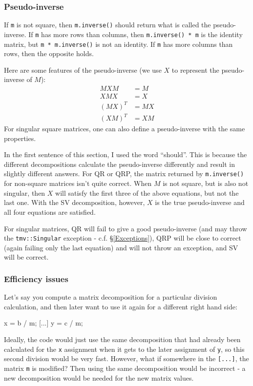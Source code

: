 \documentclass[twoside,letterpaper,11pt]{article}
\renewcommand{\tt}[1]{{\lstinline {#1}}}
\begin{document}
\subsubsection{Pseudo-inverse}
\label{Matrix_Division_Pseudoinverse}

If \tt{m} is not square, then \tt{m.inverse()} should return what is called the pseudo-inverse.
If \tt{m} has more rows than columns, then \tt{m.inverse() * m} is the identity matrix, 
but \tt{m * m.inverse()}
is not an identity.  If \tt{m} has more columns than rows, then the opposite holds.

Here are some features of the pseudo-inverse (we use $X$ to represent the pseudo-inverse
of $M$):
\begin{align*}
M X M &= M \\
X M X &= X \\
(M X)^T &= M X \\
(X M)^T &= X M 
\end{align*}
For singular square matrices, 
one can also define a pseudo-inverse with the same properties.

In the first sentence of this section, I used the word ``should''.  
This is because the different decompositions calculate the pseudo-inverse 
differently and result in slightly
different answers.  For QR or QRP, the matrix returned by \tt{m.inverse()} for
non-square matrices isn't
quite correct.  When $M$ is not square, but is also not singular, then $X$
will satisfy the first three of the above equations,
but not the last one.  With the SV decomposition, however,
$X$ is the true pseudo-inverse and all four equations are satisfied.

For singular matrices, QR will fail to give a good pseudo-inverse (and may throw the
\tt{tmv::Singular} exception - c.f. \S\ref{Exceptions}), QRP will be close to correct
(again failing only the last equation) and will not throw an exception, and SV will be correct.

\subsubsection{Efficiency issues}
\label{Matrix_Division_Efficiency}

Let's say you compute a matrix decomposition for a particular division calculation, and
then later want to use it again for a different right hand side:
\begin{tmvcode}
x = b / m;
[...]
y = c / m;
\end{tmvcode}
Ideally, the code would just use the same decomposition that had already been calculated
for the \tt{x} assignment when it gets to the later assignment of \tt{y}, 
so this second division would be very fast.
However, what if somewhere in the \tt{[...]}, the matrix \tt{m} is modified?  
Then using
the same decomposition would be incorrect - a new decomposition would be needed
for the new matrix values.
\end{document}
